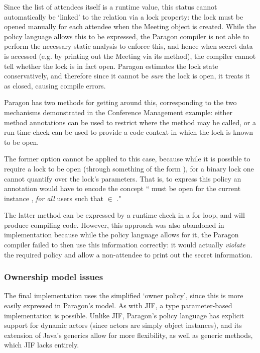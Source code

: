 Since the list of attendees itself is a runtime value, this status cannot automatically be `linked' to the relation via a lock property: the lock must be opened manually for each attendee when the Meeting object is created. While the policy language allows this to be expressed, the Paragon compiler is not able to perform the necessary static analysis to enforce this, and hence when secret data is accessed (e.g. by printing out the Meeting via its  method), the compiler cannot tell whether the lock is in fact open. Paragon estimates the lock state conservatively, and therefore since it cannot be \textit{sure} the lock is open, it treats it as closed, causing compile errors.

Paragon has two methods for getting around this, corresponding to the two mechanisms demonstrated in the Conference Management example: either method annotations can be used to restrict where the method may be called, or a run-time check can be used to provide a code context in which the lock is known to be open.

The former option cannot be applied to this case, because while it is possible to require a lock to be open (through something of the form ), for a binary lock one cannot quantify over the lock's parameters. That is, to express this policy an annotation would have to encode the concept `` must be open for the current instance , \textit{for all} users  such that  $ \in $ ."

The latter method can be expressed by a runtime check in a for loop, and will produce compiling code. However, this approach was also abandoned in implementation because while the policy language allows for it, the Paragon compiler failed to then use this information correctly: it would actually \textit{violate} the required policy and allow a non-attendee to print out the secret information.


\subsubsection{Ownership model issues}

The final implementation uses the simplified `owner policy', since this is more easily expressed in Paragon's model. As with JIF, a type parameter-based implementation is possible. Unlike JIF, Paragon's policy language has explicit support for dynamic actors (since actors are simply object instances), and its extension of Java's generics allow for more flexibility, as well as generic methods, which JIF lacks entirely.

